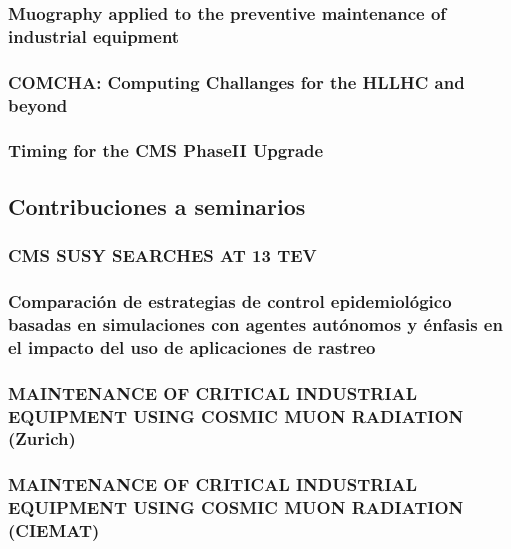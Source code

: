 \documentclass[a4paper, 11pt, twoside, openright]{report}
\begin{document}
\subsubsection{Muography applied to the preventive maintenance of industrial equipment}

\subsubsection{COMCHA: Computing Challanges for the HLLHC and beyond}

\subsubsection{Timing for the CMS PhaseII Upgrade}




\subsection{Contribuciones a seminarios}

\subsubsection{CMS SUSY SEARCHES AT 13 TEV}


\subsubsection{Comparación de estrategias de control epidemiológico basadas en simulaciones con agentes autónomos y énfasis en el impacto del uso de aplicaciones de rastreo}


\subsubsection{MAINTENANCE OF CRITICAL INDUSTRIAL EQUIPMENT USING COSMIC MUON RADIATION (Zurich)}


\subsubsection{MAINTENANCE OF CRITICAL INDUSTRIAL EQUIPMENT USING COSMIC MUON RADIATION (CIEMAT)}

\end{document}
